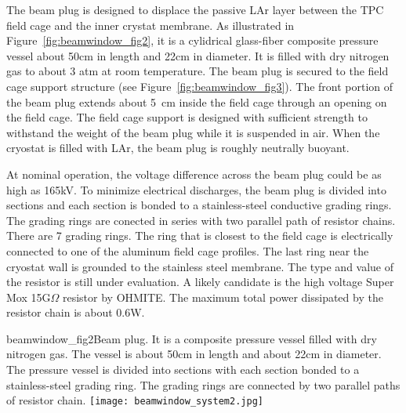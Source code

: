 The beam plug is designed to displace the passive LAr layer between the TPC field cage and the inner crystat membrane. As illustrated in Figure~\ref{fig:beamwindow_fig2}, it is a cylidrical glass-fiber composite pressure vessel about 50cm in length and  22cm in diameter. It is filled with dry nitrogen gas to about 3 atm at room temperature. The beam plug is secured to the field cage support structure (see Figure~\ref{fig:beamwindow_fig3}). The front portion of the beam plug extends about 5~cm inside the field cage through an opening on the field cage. The field cage support is designed with sufficient strength to withstand the weight of the beam plug while it is suspended in air. When the cryostat is filled with LAr, the beam plug is roughly neutrally buoyant. 

At nominal operation, the voltage difference across the beam plug could be as high as 165kV. To minimize electrical discharges, the beam plug is divided into sections and each section is bonded to a stainless-steel conductive grading rings. The grading rings are conected in series with two parallel path of resistor chains. There are 7 grading rings. The ring that is closest to the field cage is electrically connected to one of the aluminum field cage profiles. The last ring near the cryostat wall is grounded to the stainless steel membrane. The type and value of the resistor is still under evaluation. A likely candidate is the high voltage Super Mox 15G$\Omega$ resistor by OHMITE. The maximum total power dissipated by the resistor chain is about 0.6W.

\begin{cdrfigure}{beamwindow_fig2}{Beam plug. It is a  composite pressure vessel filled with dry nitrogen gas. The vessel is about 50cm in length and about 22cm in diameter. The pressure vessel is divided into sections with each section bonded to a stainless-steel grading ring. The grading rings are connected by two parallel paths of resistor chain.}
  \texttt{[image: beamwindow\_system2.jpg]}
\end{cdrfigure}

